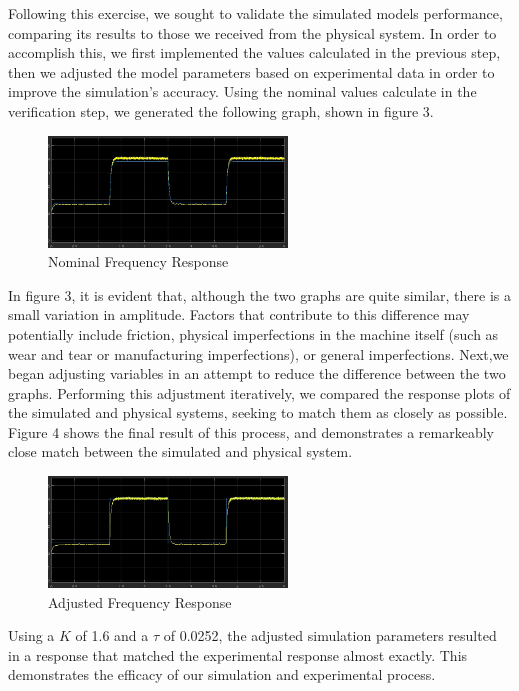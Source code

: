 \documentclass[conference,compsoc]{IEEEtran}
\begin{document}
Following this exercise, we sought to validate the simulated models performance, comparing its results to those we received from the physical system. In order to accomplish this, we first implemented the values calculated in the previous step, then we adjusted the model parameters based on experimental data in order to improve the simulation's accuracy. Using the nominal values calculate in the verification step, we generated the following graph, shown in figure 3.
\begin{figure}[!t]
  \centering
  \includegraphics[width=2.5in]{NominalFrequencyResponse.jpg}
  \caption{Nominal Frequency Response}
  \label{fig_sim}
\end{figure}
In figure 3, it is evident that, although the two graphs are quite similar, there is a small variation in amplitude. Factors that contribute to this difference may potentially include friction, physical imperfections in the machine itself (such as wear and tear or manufacturing imperfections), or general imperfections.
Next,we began adjusting variables in an attempt to reduce the difference between the two graphs. Performing this adjustment iteratively, we compared the response plots of the simulated and physical systems, seeking to match them as closely as possible. Figure 4 shows the final result of this process, and demonstrates a remarkeably close match between the simulated and physical system.
\begin{figure}[!t]
  \centering
  \includegraphics[width=2.5in]{AdjustedFrequencyResponse.jpg}
  \caption{Adjusted Frequency Response}
  \label{fig_sim}
\end{figure}
Using a $K$ of 1.6 and a $\tau$ of 0.0252, the adjusted simulation parameters resulted in a response that matched the experimental response almost exactly. This demonstrates the efficacy of our simulation and experimental process.
\end{document}
